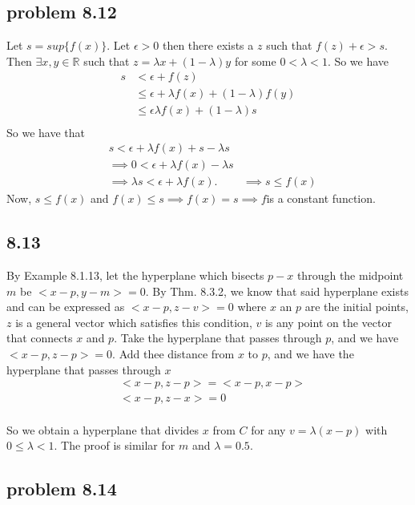 \documentclass[letterpaper,12pt]{article}
\theoremstyle{definition}
\begin{document}
\subsection*{problem 8.12}
Let $s = sup\{ f(x) \}$. Let $\epsilon > 0$ then there exists a $z$ such that $f(z) + \epsilon > s$. Then $ \exists x,y \in\mathbb{R}$ such that $ z= \lambda x + (1-\lambda)y$ for some $0< \lambda<1$. So we have 
\begin{align*}
s &< \epsilon + f(z)\\ &\leq \epsilon + \lambda f(x) + (1-\lambda)f(y) \\&\leq \epsilon \lambda f(x) + (1-\lambda)s\\
\end{align*}
So we have that
\begin{align*}
&s < \epsilon + \lambda f(x) + s - \lambda s\\&\implies  0 < \epsilon + \lambda f(x) - \lambda s\\ &\implies \lambda s < \epsilon + \lambda f(x). 
&\implies s\leq f(x)
\end{align*}
Now, $s\leq f(x)$ and $f(x) \leq s \implies f(x) = s \implies f $is a constant function. 

\subsection*{8.13}


By Example 8.1.13, let the hyperplane which bisects $p-x$ through the midpoint $m$ be $<x-p,y-m>=0$. 
By Thm. 8.3.2, we know that said hyperplane exists and can be expressed as $<x-p,z-v>=0$ where $x$ an $p$ are the initial points, $z$ is a general vector which satisfies this condition, $v$ is any point on the vector that connects $x$ and $p$. Take the hyperplane that passes through $p$, and we have $<x-p,z-p>=0$. Add thee distance from $x$ to $p$, and we have the hyperplane that passes through $x$  \\

\begin{align*}
& <x-p,z-p> = <x-p,x-p> \\
& <x-p,z-x>=0
\end{align*}\\

So we obtain a hyperplane that divides $x$ from $C$ for any $v=\lambda (x-p)$ with $ 0 \leq \lambda < 1$. The proof is similar for $m$ and $\lambda = 0.5$. \\

\subsection*{problem 8.14}
\end{document}
